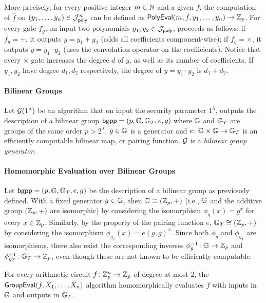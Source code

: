 More precisely, for every positive integer $m \in \mathbb{N}$ and a given $f$, the
computation of $\hat{f}$ on $(y_1, \dotsc, y_n) \in \mathcal{J}^n_{\operatorname{\mathsf{poly}}}$ can be
defined as $\PolyEval(m, f, y_1, \dotsc, y_n) \to \bbZ_p$. For every gate
$f_g$, on input two polynomials $y_1, y_2 \in \mathcal{J}_{\operatorname{\mathsf{poly}}}$, proceeds as
follows: if $f_g = +$, it outputs $y = y_1 + y_2$ (adds all coefficients
component-wise); if $f_g = \times$, it outputs $y = y_1 \cdot y_2$ (uses the
convolution operator on the coefficients). Notice that every $\times$ gate
increases the degree $d$ of $y$, as well as its number of coefficients. If
$y_1, y_2$ have degree $d_1, d_2$ respectively, the degree of $y = y_1 \cdot
y_2$ is $d_1 + d_2$.

\paragraph*{Bilinear Groups} Let $\mathcal{G}(1^\lambda)$ be an algorithm that on
input the security parameter $1^\lambda$, outputs the description of a bilinear
group $\bgpp = (p, \bbG, \bbG_T, e, g)$ where $\mathbb{G}$ and $\mathbb{G}_T$ are groups of
the same order $p > 2^\lambda$, $g \in \mathbb{G}$ is a generator and
$\function{e}{\bbG \times \bbG}{\bbG_T}$ is an efficiently computable bilinear
map, or pairing function. $\mathcal{G}$ is a \emph{bilinear group generator}.

\paragraph*{Homomorphic Evaluation over Bilinear Groups} Let $\bgpp = (p, \bbG,
\bbG_T, e, g)$ be the description of a bilinear group as previously defined.
With a fixed generator $g \in \mathbb{G}$, then $\mathbb{G} \cong (\mathbb{Z}_p, +)$ (i.e.,
$\mathbb{G}$ and the additive group $(\mathbb{Z}_p, +)$ are isomorphic) by considering the
isomorphism $\phi_g(x) = g^x$ for every $x \in \mathbb{Z}_p$. Similarly, by the
property of the pairing function $e$, $\mathbb{G}_T \cong (\mathbb{Z}_p, +)$ by considering
the isomorphism $\phi_{g_T}(x) = e(g,g)^x$. Since both $\phi_g$ and
$\phi_{g_T}$ are isomorphisms, there also exist the corresponding inverses
$\function{\phi_g^{-1}}{\bbG}{\bbZ_p}$ and
$\function{\phi_{g_T}^{-1}}{\bbG_T}{\bbZ_p}$, even though these are not known
to be efficiently computable.

For every arithmetic circuit $\function{f}{\bbZ_p^n}{\bbZ_p}$ of degree at most
2, the $\GroupEval(f, X_1, \dotsc, X_n)$ algorithm homomorphically evaluates
$f$ with inputs in $\mathbb{G}$ and outputs in $\mathbb{G}_T$.

